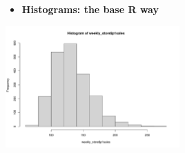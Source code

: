 \documentclass[
  ignorenonframetext,
]{beamer}
\newenvironment{Shaded}{\begin{snugshade}}{\end{snugshade}}
\newcommand{\FunctionTok}[1]{\textcolor[rgb]{0.28,0.35,0.67}{#1}}
\newcommand{\NormalTok}[1]{\textcolor[rgb]{0.00,0.23,0.31}{#1}}
\newcommand{\SpecialCharTok}[1]{\textcolor[rgb]{0.37,0.37,0.37}{#1}}
\providecommand{\tightlist}{%
  \setlength{\itemsep}{0pt}\setlength{\parskip}{0pt}}\usepackage{longtable,booktabs,array}
\begin{document}
\begin{frame}[fragile]{}
\label{section-11}
\begin{itemize}
\tightlist
\item
  \textbf{Histograms: the base R way}
\end{itemize}

\tiny

\begin{Shaded}
\end{Shaded}

\begin{center}
\includegraphics[width=0.5\textwidth,height=\textheight]{003_describing_data_files/figure-beamer/unnamed-chunk-10-1.pdf}
\end{center}
\end{frame}
\end{document}
